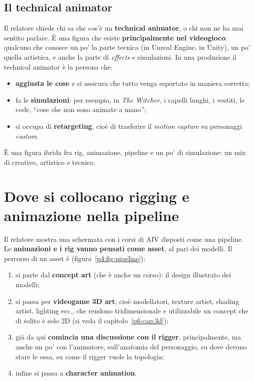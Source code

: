 \subsection{Il technical animator}

Il relatore chiede chi sa che cos'è un \textbf{technical animator}, o chi non
ne ha mai sentito parlare. È una figura che esiste \textbf{principalmente
nel videogioco}: qualcuno che conosce un po' la parte tecnica (in Unreal
Engine, in Unity), un po' quella artistica, e anche la parte di
\emph{effects} e simulazioni. In una produzione il technical animator è la
persona che:
\begin{itemize}
  \item \textbf{aggiusta le cose} e si assicura che tutto venga esportato in
        maniera corretta;
  \item fa le \textbf{simulazioni}: per esempio, in \emph{The Witcher}, i
        capelli lunghi, i vestiti, le code, ``cose che non sono animate a
        mano'';
  \item si occupa di \textbf{retargeting}, cioè di trasferire il
        \emph{motion capture} su personaggi \emph{custom}.
\end{itemize}
È una figura ibrida fra rig, animazione, pipeline e un po' di simulazione:
un mix di creativo, artistico e tecnico.

\section{Dove si collocano rigging e animazione nella pipeline}
\label{p4:sec:pipeline}

Il relatore mostra una schermata con i corsi di AIV disposti come una
pipeline. Le \textbf{animazioni e i rig vanno pensati come asset}, al pari
dei modelli. Il percorso di un asset è (figura~\ref{p4:fig:pipeline}):
\begin{enumerate}
  \item si parte dal \textbf{concept art} (che è anche un corso): il design
        illustrato dei modelli;
  \item si passa per \textbf{videogame 3D art}, cioè modellatori, texture
        artist, shading artist, lighting ecc., che rendono tridimensionale e
        utilizzabile un concept che di solito è solo 2D (si veda il
        capitolo~\ref{p6:cap:3d});
  \item già da qui \textbf{comincia una discussione con il rigger},
        principalmente, ma anche un po' con l'animatore, sull'anatomia del
        personaggio, su dove devono stare le ossa, su come il rigger vuole la
        topologia;
  \item infine si passa a \textbf{character animation}.
\end{enumerate}

